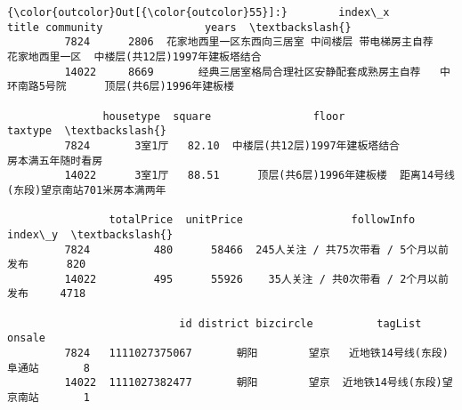 \documentclass[11pt]{article}
\begin{document}
\begin{Verbatim}[commandchars=\\\{\}]
{\color{outcolor}Out[{\color{outcolor}55}]:}        index\_x                       title community                years  \textbackslash{}
         7824      2806  花家地西里一区东西向三居室 中间楼层 带电梯房主自荐   花家地西里一区  中楼层(共12层)1997年建板塔结合   
         14022     8669       经典三居室格局合理社区安静配套成熟房主自荐   中环南路5号院      顶层(共6层)1996年建板楼   
         
               housetype  square                floor                  taxtype  \textbackslash{}
         7824       3室1厅   82.10  中楼层(共12层)1997年建板塔结合                房本满五年随时看房   
         14022      3室1厅   88.51      顶层(共6层)1996年建板楼  距离14号线(东段)望京南站701米房本满两年   
         
                totalPrice  unitPrice                 followInfo  index\_y  \textbackslash{}
         7824          480      58466  245人关注 / 共75次带看 / 5个月以前发布      820   
         14022         495      55926    35人关注 / 共0次带看 / 2个月以前发布     4718   
         
                           id district bizcircle          tagList  onsale  
         7824   1111027375067       朝阳        望京   近地铁14号线(东段)阜通站       8  
         14022  1111027382477       朝阳        望京  近地铁14号线(东段)望京南站       1  
\end{Verbatim}
            

    
    
    
    
\end{document}

